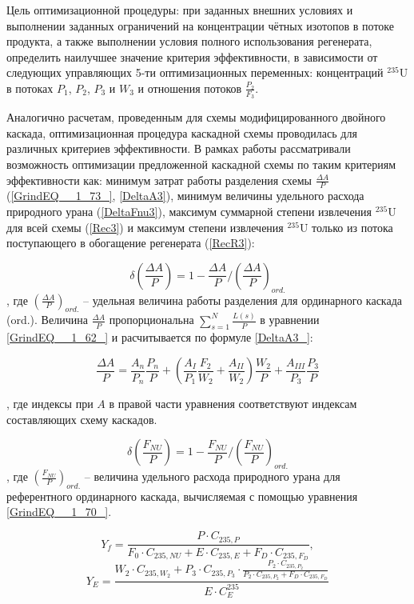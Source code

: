 {Цель оптимизационной процедуры: при заданных внешних условиях и выполнении заданных ограничений на концентрации чётных изотопов в потоке продукта, а также выполнении условия полного использования регенерата, определить наилучшее значение критерия эффективности, в зависимости от следующих управляющих 5-ти оптимизационных переменных: концентраций $^{235}$U в потоках $P_1$, $P_2$, $P_3$ и $W_3$ и отношения потоков $\frac{P_{2}}{F_3}$.

Аналогично расчетам, проведенным для схемы модифицированного двойного каскада, оптимизационная процедура каскадной схемы проводилась для различных критериев эффективности. В рамках работы рассматривали возможность оптимизации предложенной каскадной схемы по таким критериям эффективности как: минимум затрат работы разделения схемы $\frac{\Delta A}{P}$ (\ref{GrindEQ__1_73_}, \ref{DeltaA3}), минимум величины удельного расхода природного урана (\ref{DeltaFnu3}), максимум суммарной степени извлечения $^{235}$U для всей схемы (\ref{Rec3}) и максимум степени извлечения $^{235}$U только из потока поступающего в обогащение регенерата (\ref{RecR3}):

\begin{equation} \label{DeltaA3} 
    \delta(\frac{\Delta A}{P})=1-\frac{\Delta A}{P}/(\frac{\Delta A}{P})_{ord.}
\end{equation}
, где $(\frac{\Delta A}{P})_{ord.}$ -- удельная величина работы разделения для ординарного каскада (ord.). Величина $\frac{\Delta A}{P}$ пропорциональна $\sum _{s=1}^{N}\frac{L(s)}{P}$ в уравнении \ref{GrindEQ__1_62_} и расчитывается по формуле \ref{DeltaA3_}:

\begin{equation} \label{DeltaA3_} 
\frac{\Delta A}{P} = \frac{A_n}{P_n} \frac{P_n}{P}+(\frac{A_I}{P_1} \frac{F_2}{W_2}+\frac{A_{II}}{W_2}) \frac{W_2}{P} + \frac{A_{III}}{P_3} \frac{P_3}{P}
\end{equation}

, где индексы при $A$ в правой части уравнения соответствуют индексам составляющих схему каскадов.

\begin{equation} \label{DeltaFnu3} 
\delta(\frac{F_{NU}}{P})=1-\frac{F_{NU}}{P}/(\frac{F_{NU}}{P})_{ord.}
\end{equation} 
, где $(\frac{F_{NU}}{P})_{ord.}$ -- величина удельного расхода природного урана для референтного ординарного каскада, вычисляемая с помощью уравнения \ref{GrindEQ__1_70_}.

\begin{equation} \label{Rec3} 
    Y_{f} = \frac{P \cdot C_{235,P}}{F_0 \cdot C_{235,NU} + E \cdot C_{235,E} + F_D \cdot C_{235,F_D}},
\end{equation} 
\begin{equation} \label{RecR3} 
    Y_{E} = \frac{W_2\cdot C_{235,W_2} + P_3\cdot C_{235,P_3}\cdot \frac{P_2\cdot C_{235,P_2}}{P_2\cdot C_{235,P_2}+ F_D \cdot C_{235,F_D}}}{E \cdot C_{E}^{235}}        
\end{equation} 

}
